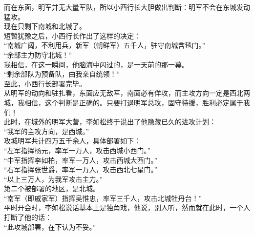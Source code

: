 \begin{multicols}{\theparacolNo}
而在东面，明军并无大量军队，所以小西行长大胆做出判断：明军不会在东城发动猛攻。\\

现在只剩下南城和北城了。\\

短暂犹豫之后，小西行长作出了这样的决定：\\

“南城广阔，不利用兵，新军（朝鲜军）五千人，驻守南城含毯门。”\\

“余部主力防守北城！”\\

我相信，在这一瞬间，他脑海中闪过的，是一天前的那一幕。\\

“剩余部队为预备队，由我亲自统领！”\\

至此，小西行长部署完毕。\\

从明军的动向和驻扎看，东面应无敌军，南面必有佯攻，而主攻方向一定是西北两城，我相信，这个判断是正确的。只要打退明军总攻，固守待援，胜利必定属于我们！\\

此时，在城外的明军大营，李如松终于说出了他隐藏已久的进攻计划：\\

“我军的主攻方向，是西城。”\\

攻城明军共计四万五千余人，具体部署如下：\\

“左军指挥杨元，率军一万人，攻击西城小西门。”\\

“中军指挥李如柏，率军一万人，攻击西城大西门。”\\

“右军指挥张世爵，率军一万人，攻击西北七星门。”\\

“以上三万人，为我军攻击主力。”\\

第二个被部署的地区，是北城。\\

“南军（即戚家军）指挥吴惟忠，率军三千人，攻击北城牡丹台！”\\

平时开会时，李如松说话基本上是独角戏，他说，别人听，然而就在此时，一个人打断了他的话：\\

“此攻城部署，在下认为不妥。”\\


\end{multicols}
